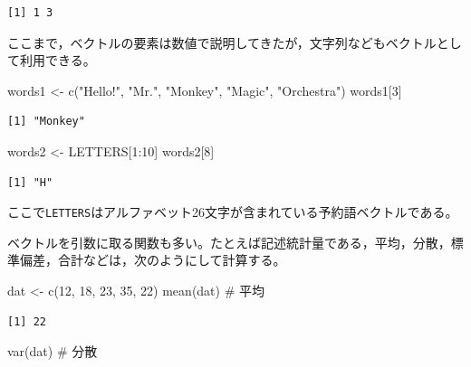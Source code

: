 \documentclass[
  a4paper,
]{ltjsbook}
\newenvironment{Shaded}{\begin{snugshade}}{\end{snugshade}}
\newcommand{\CommentTok}[1]{\textcolor[rgb]{0.37,0.37,0.37}{#1}}
\newcommand{\DecValTok}[1]{\textcolor[rgb]{0.68,0.00,0.00}{#1}}
\newcommand{\FunctionTok}[1]{\textcolor[rgb]{0.28,0.35,0.67}{#1}}
\newcommand{\NormalTok}[1]{\textcolor[rgb]{0.00,0.23,0.31}{#1}}
\newcommand{\OtherTok}[1]{\textcolor[rgb]{0.00,0.23,0.31}{#1}}
\newcommand{\SpecialCharTok}[1]{\textcolor[rgb]{0.37,0.37,0.37}{#1}}
\newcommand{\StringTok}[1]{\textcolor[rgb]{0.13,0.47,0.30}{#1}}
\begin{document}
\begin{verbatim}
[1] 1 3
\end{verbatim}

ここまで，ベクトルの要素は数値で説明してきたが，文字列などもベクトルとして利用できる。

\begin{Shaded}
\begin{Highlighting}[]
\NormalTok{words1 }\OtherTok{\textless{}{-}} \FunctionTok{c}\NormalTok{(}\StringTok{"Hello!"}\NormalTok{, }\StringTok{"Mr."}\NormalTok{, }\StringTok{"Monkey"}\NormalTok{, }\StringTok{"Magic"}\NormalTok{, }\StringTok{"Orchestra"}\NormalTok{)}
\NormalTok{words1[}\DecValTok{3}\NormalTok{]}
\end{Highlighting}
\end{Shaded}

\begin{verbatim}
[1] "Monkey"
\end{verbatim}

\begin{Shaded}
\begin{Highlighting}[]
\NormalTok{words2 }\OtherTok{\textless{}{-}}\NormalTok{ LETTERS[}\DecValTok{1}\SpecialCharTok{:}\DecValTok{10}\NormalTok{]}
\NormalTok{words2[}\DecValTok{8}\NormalTok{]}
\end{Highlighting}
\end{Shaded}

\begin{verbatim}
[1] "H"
\end{verbatim}

ここで\texttt{LETTERS}はアルファベット26文字が含まれている予約語ベクトルである。

ベクトルを引数に取る関数も多い。たとえば記述統計量である，平均，分散，標準偏差，合計などは，次のようにして計算する。

\begin{Shaded}
\begin{Highlighting}[]
\NormalTok{dat }\OtherTok{\textless{}{-}} \FunctionTok{c}\NormalTok{(}\DecValTok{12}\NormalTok{, }\DecValTok{18}\NormalTok{, }\DecValTok{23}\NormalTok{, }\DecValTok{35}\NormalTok{, }\DecValTok{22}\NormalTok{)}
\FunctionTok{mean}\NormalTok{(dat) }\CommentTok{\# 平均}
\end{Highlighting}
\end{Shaded}

\begin{verbatim}
[1] 22
\end{verbatim}

\begin{Shaded}
\begin{Highlighting}[]
\FunctionTok{var}\NormalTok{(dat) }\CommentTok{\# 分散}
\end{Highlighting}
\end{Shaded}
\end{document}
